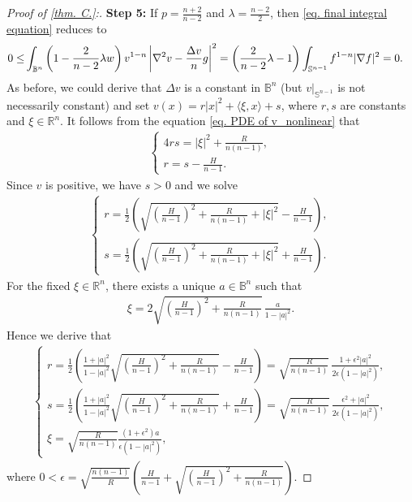 \documentclass[12pt]{amsart}
\numberwithin{equation}{section}
\numberwithin{lemma}{section}
\numberwithin{proposition}{section}
\numberwithin{corollary}{section}
\numberwithin{remark}{section}
\begin{document}
\begin{proof}[Proof of \cref{thm. C.}:]
\textbf{Step 5:} If $p=\frac{n+2}{n-2}$ and $\lambda=\frac{n-2}{2}$, then \cref{eq. final integral equation} reduces to
    \begin{align*}
        0\leq&\int_{\mathbb{B}^n}
        \left(1-\frac{2}{n-2}\lambda w\right)
        v^{1-n}
        \left|\nabla^2 v-\frac{\Delta v}{n}g\right|^2
        \notag
        =\left(\frac{2}{n-2}\lambda-1\right)
        \int_{\mathbb{S}^{n-1}}f^{1-n}|\nabla f|^2= 0.
    \end{align*}
    As before, we could derive that $\Delta v$ is a constant in $\mathbb{B}^n$ (but $v|_{\mathbb{S}^{n-1}}$ is not necessarily constant) and set $v(x)=r|x|^2+\langle\xi,x\rangle+s$, where $r,s$ are constants and $\xi\in\mathbb{R}^n$. It follows from the equation \cref{eq. PDE of v_nonlinear} that
    \begin{align*}
        \begin{cases}
            4rs=|\xi|^2+\frac{R}{n(n-1)},\\
            r=s-\frac{H}{n-1}.
        \end{cases}
    \end{align*}
    Since $v$ is positive, we have $s>0$ and we solve
    \begin{align*}
    \begin{cases}
        r=\frac{1}{2}\left(
        \sqrt{(\frac{H}{n-1})^2+\frac{R}{n(n-1)}+|\xi|^2}
        -\frac{H}{n-1}
        \right),\\
        s=\frac{1}{2}\left(
        \sqrt{(\frac{H}{n-1})^2+\frac{R}{n(n-1)}+|\xi|^2}
        +\frac{H}{n-1}
        \right).
    \end{cases}
    \end{align*}    
    For the fixed $\xi\in \mathbb{R}^n$, there exists a unique $a\in\mathbb{B}^n$ such that
    \begin{align*}
        \xi=2\sqrt{\left(\frac{H}{n-1}\right)^2+\frac{R}{n(n-1)}}\,\frac{a}{1-|a|^2}.
    \end{align*}
    Hence we derive that
    \begin{align*}
        \begin{cases}
            r=\frac{1}{2}
            \left(
            \frac{1+|a|^2}{1-|a|^2}\sqrt{(\frac{H}{n-1})^2+\frac{R}{n(n-1)}}
            -\frac{H}{n-1}
            \right)
            =\sqrt{\frac{R}{n(n-1)}}\,
            \frac{1+\epsilon^2|a|^2}{2\epsilon(1-|a|^2)},\\
            s=\frac{1}{2}
            \left(
            \frac{1+|a|^2}{1-|a|^2}\sqrt{(\frac{H}{n-1})^2+\frac{R}{n(n-1)}}
            +\frac{H}{n-1}
            \right)
            =\sqrt{\frac{R}{n(n-1)}}\,
            \frac{\epsilon^2+|a|^2}{2\epsilon(1-|a|^2)},\\
            \xi=\sqrt{\frac{R}{n(n-1)}}
            \frac{(1+\epsilon^2)a}{\epsilon(1-|a|^2)},
        \end{cases}     
    \end{align*}
    where $0<\epsilon
            =\sqrt{\frac{n(n-1)}{R}}
            \left(\frac{H}{n-1}+\sqrt{(\frac{H}{n-1})^2+\frac{R}{n(n-1)}}\right)$.
            

\end{proof}
\end{document}
